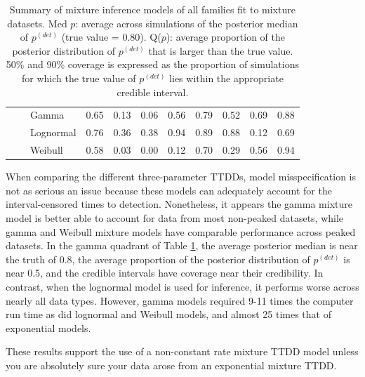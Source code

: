 \documentclass[useAMS,usenatbib,referee,12pt]{article}
\newcommand{\pdet}{p^{(det)}}
\begin{document}
\begin{table}[ht]
\begin{tabular}{l|l|l|cccc|cccc}
\cline{2-11}
& \parbox[t]{2mm}{} & Gamma & 0.65 & 0.13 & 0.06 & 0.56 & 0.79 & 0.52 & 0.69 & 0.88 \\ 
& &   Lognormal & 0.76 & 0.36 & 0.38 & 0.94 & 0.89 & 0.88 & 0.12 & 0.69 \\ 
& &   Weibull & 0.58 & 0.03 & 0.00 & 0.12 & 0.70 & 0.29 & 0.56 & 0.94 \\ 
   \hline
\end{tabular}
\caption{Summary of mixture inference models of all families fit to mixture datasets.  
Med $p$: average across simulations of the posterior median of $\pdet$ (true value = 0.80).  
Q($p$): average proportion of the posterior distribution of $\pdet$ that is larger than the true value.  
50\% and 90\% coverage is expressed as the proportion of simulations for which the true value of $\pdet$ lies within the appropriate credible interval.}
\label{tbl:sim2}
\end{table}
\fi

When comparing the different three-parameter TTDDs, model misspecification is not as serious an issue because these models can adequately account for the interval-censored times to detection. 
Nonetheless, it appears the gamma mixture model is better able to account for data from most non-peaked datasets, while gamma and Weibull mixture models have comparable performance across peaked datasets. 
In the gamma quadrant of Table \ref{tbl:sim2}, the average posterior median is near the truth of 0.8, the average proportion of the posterior distribution of $\pdet$ is near 0.5, and the credible intervals have coverage near their credibility. 
In contrast, when the lognormal model is used for inference, it performs worse across nearly all data types.
However, gamma models required 9-11 times the computer run time as did lognormal and Weibull models, and almost 25 times that of exponential models.

These results support the use of a non-constant rate mixture TTDD model unless you are absolutely sure your data arose from an exponential mixture TTDD.
\end{document}
